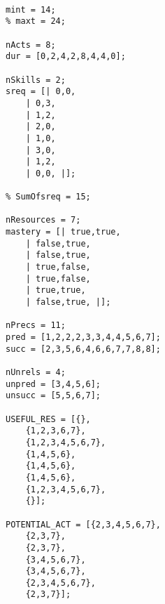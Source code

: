 \documentclass[12pt]{article}
\begin{document}
\begin{lstlisting}[language=minizinc]
% seed = 0

mint = 14;
% maxt = 24;

nActs = 8;
dur = [0,2,4,2,8,4,4,0];

nSkills = 2;
sreq = [| 0,0,
    | 0,3,
    | 1,2,
    | 2,0,
    | 1,0,
    | 3,0,
    | 1,2,
    | 0,0, |];

% SumOfsreq = 15;

nResources = 7;
mastery = [| true,true,
    | false,true,
    | false,true,
    | true,false,
    | true,false,
    | true,true,
    | false,true, |];

nPrecs = 11;
pred = [1,2,2,2,3,3,4,4,5,6,7];
succ = [2,3,5,6,4,6,6,7,7,8,8];

nUnrels = 4;
unpred = [3,4,5,6];
unsucc = [5,5,6,7];

USEFUL_RES = [{},
    {1,2,3,6,7},
    {1,2,3,4,5,6,7},
    {1,4,5,6},
    {1,4,5,6},
    {1,4,5,6},
    {1,2,3,4,5,6,7},
    {}];

POTENTIAL_ACT = [{2,3,4,5,6,7},
    {2,3,7},
    {2,3,7},
    {3,4,5,6,7},
    {3,4,5,6,7},
    {2,3,4,5,6,7},
    {2,3,7}];
\end{lstlisting}
\end{document}
